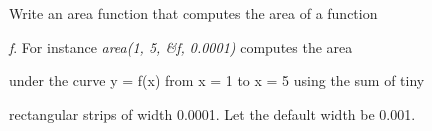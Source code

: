 Write an area function that computes the area of a function

\textit{f}. For instance \textit{area(1, 5, \&f, 0.0001)} computes the area

under the curve y = f(x) from x = 1 to x = 5 using the sum of tiny

rectangular strips of width 0.0001. Let the default width be 0.001.

